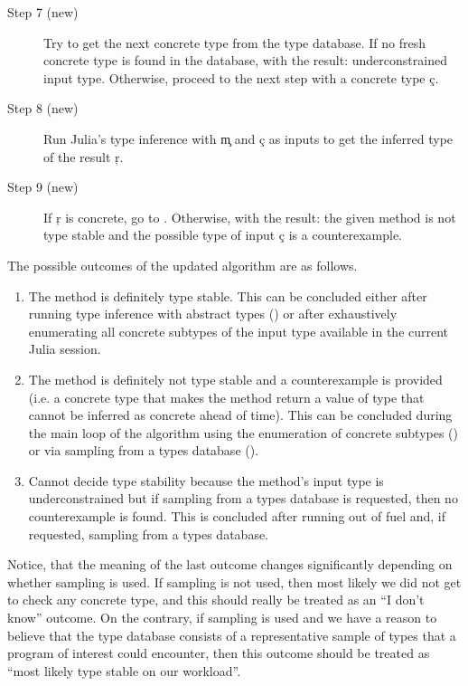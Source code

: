 \begin{description}
  \item[Step 7 (new)]
    Try to get the next concrete type from the type database.
    If no fresh concrete type is found in the database,  with
    the result: underconstrained input type.
    Otherwise, proceed to the next step with a concrete type \c c.
  \item[Step 8 (new)]
    Run Julia’s type inference with \c m and \c c as
    inputs to get the inferred type of the result \c r.
  \item[Step 9 (new)]
    If \c r  is concrete, go to . Otherwise, 
    with the result: the given method is not type stable and the possible type
    of input \c c is a counterexample.
\end{description}


The possible outcomes of the updated algorithm are as follows.
\begin{enumerate}

  \item The method is definitely type stable. This can be concluded either after
  running type inference with abstract types
  () or after exhaustively enumerating all
  concrete subtypes of the input type available in the current Julia session.

  \item The method is definitely not type stable and a counterexample is provided
  (i.e. a
  concrete type that makes the method return a value of type that cannot be
  inferred as concrete ahead of time). This can be concluded during the main
  loop of the algorithm using the enumeration of concrete subtypes
  () or via
  sampling from a types database ().

  \item
  Cannot decide type stability because the method's input type is
  underconstrained but if sampling from a types database is requested, then no
  counterexample is found. This is concluded after running out
  of fuel and, if requested, sampling from a types database.
\end{enumerate}

Notice, that the meaning of the last outcome changes significantly depending on whether
sampling is used. If sampling is not used, then most likely we did not get to
check any concrete type, and this should really be treated as an ``I don't know''
outcome. On the contrary, if sampling is used and we have a reason to believe
that the type database consists of a representative sample of types that a
program of interest could encounter, then this outcome should be treated as
``most likely type stable on our workload''.



